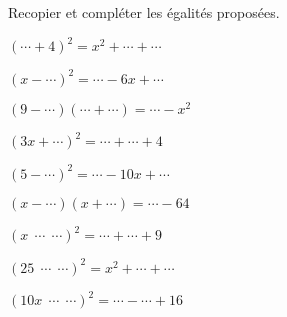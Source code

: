 
Recopier et compléter les égalités proposées.

\begin{minipage}{5cm}
\begin{description}
\item $(\cdots +4)^2=x^2 +\cdots +\cdots$ 
\item $(x - \cdots)^2=\cdots-6x + \cdots$ 
\item $(9 - \cdots)(\cdots + \cdots)=\cdots - x^2$ 
\end{description}
\end{minipage}
\begin{minipage}{5cm}
\begin{description}
\item $(3x + \cdots)^2=\cdots +\cdots + 4$ 
\item $(5 - \cdots)^2=\cdots - 10x + \cdots$  
\item $(x -\cdots)(x +\cdots)=\cdots - 64$
\end{description}
\end{minipage}
\begin{minipage}{5cm}
\begin{description}
\item $(x ~~ \cdots ~~ \cdots)^2=\cdots +\cdots + 9$
\item $(25 ~~ \cdots ~~ \cdots)^2=x^2+\cdots + \cdots$
\item $(10x ~~ \cdots ~~ \cdots)^2=\cdots-\cdots + 16$
\end{description}
\end{minipage}
